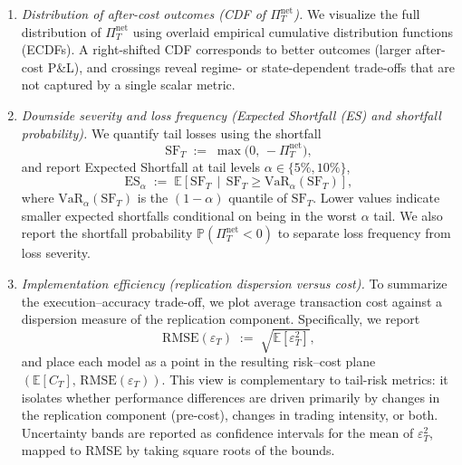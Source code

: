 \begin{enumerate}
\item \textit{Distribution of after-cost outcomes (CDF of $\Pi_T^{\mathrm{net}}$).}
We visualize the full distribution of $\Pi_T^{\mathrm{net}}$ using overlaid empirical cumulative distribution functions (ECDFs).
A right-shifted CDF corresponds to better outcomes (larger after-cost P\&L), and crossings reveal regime- or state-dependent trade-offs that are not captured by a single scalar metric.

\item \textit{Downside severity and loss frequency (Expected Shortfall (ES) and shortfall probability).}
We quantify tail losses using the shortfall
\begin{equation}
\mathrm{SF}_T \;:=\; \max\!\bigl(0,\,-\Pi_T^{\mathrm{net}}\bigr),
\label{eq:sf_def}
\end{equation}
and report Expected Shortfall at tail levels $\alpha\in\{5\%,10\%\}$,
\begin{equation}
\mathrm{ES}_{\alpha} \;:=\; \mathbb{E}\!\left[\mathrm{SF}_T \,\middle|\, \mathrm{SF}_T \ge \mathrm{VaR}_{\alpha}(\mathrm{SF}_T)\right],
\label{eq:es_def}
\end{equation}
where $\mathrm{VaR}_{\alpha}(\mathrm{SF}_T)$ is the $(1-\alpha)$ quantile of $\mathrm{SF}_T$.
Lower values indicate smaller expected shortfalls conditional on being in the worst $\alpha$ tail.
We also report the shortfall probability $\mathbb{P}(\Pi_T^{\mathrm{net}}<0)$ to separate loss frequency from loss severity.

\item \textit{Implementation efficiency (replication dispersion versus cost).}
To summarize the execution--accuracy trade-off, we plot average transaction cost against a dispersion measure of the replication component.
Specifically, we report
\begin{equation}
\mathrm{RMSE}(\varepsilon_T) \;:=\; \sqrt{\mathbb{E}\!\left[\varepsilon_T^2\right]},
\label{eq:rmse_eps_def}
\end{equation}
and place each model as a point in the resulting risk--cost plane $(\mathbb{E}[C_T],\,\mathrm{RMSE}(\varepsilon_T))$.
This view is complementary to tail-risk metrics: it isolates whether performance differences are driven primarily by changes in the replication component (pre-cost), changes in trading intensity, or both.
Uncertainty bands are reported as confidence intervals for the mean of $\varepsilon_T^2$, mapped to RMSE by taking square roots of the bounds.
\end{enumerate}

